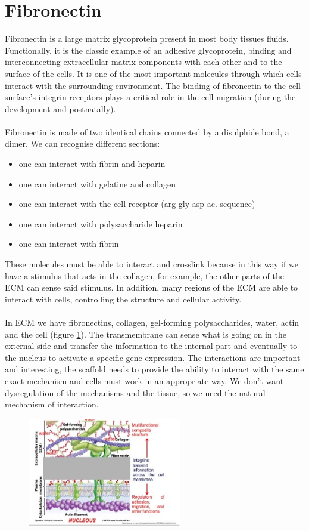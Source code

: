 \section{Fibronectin}
Fibronectin is a large matrix glycoprotein present in most body tissues fluids.
Functionally, it is the classic example of an adhesive glycoprotein, binding and interconnecting extracellular matrix components with each other and to the surface of the cells.
It is one of the most important molecules through which cells interact with the surrounding environment.
The binding of fibronectin to the cell surface’s integrin receptors plays a critical role in the cell migration (during the development and postnatally).
\\
\\
\noindent
Fibronectin is made of two identical chains connected by a disulphide bond, a dimer.
We can recognise different sections:
\begin{itemize}
\item one can interact with fibrin and heparin
\item one can interact with gelatine and collagen
\item one can interact with the cell receptor (arg-gly-asp ac. sequence)
\item one can interact with polysaccharide heparin
\item one can interact with fibrin
\end{itemize}
\noindent
These molecules must be able to interact and crosslink because in this way if we have a stimulus that acts in the collagen, for example, the other parts of the ECM can sense said stimulus. In addition, many regions of the ECM are able to interact with cells, controlling the structure and cellular activity.
\\
\\
\noindent
In ECM we have fibronectins, collagen, gel-forming polysaccharides, water, actin and the cell (figure \ref{fig:structure}).
The transmembrane can sense what is going on in the external side and transfer the information to the internal part and eventually to the nucleus to activate a specific gene expression.
The interactions are important and interesting, the scaffold needs to provide the ability to interact with the same exact mechanism and cells must work in an appropriate way.
We don’t want dysregulation of the mechanisms and the tissue, so we need the natural mechanism of interaction.

\begin{figure}[ht]
\centering
\includegraphics[width=0.6\textwidth]{structure}
\caption{\label{fig:structure}}
\end{figure}

